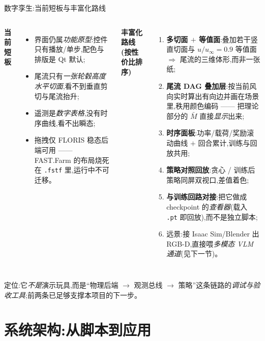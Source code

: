 \documentclass[aspectratio=169,11pt,UTF8]{ctexbeamer}
\newcommand{\wind}{u_{\infty}}
\newcommand{\emphb}[1]{\textcolor{myred}{\textbf{#1}}}
\newcommand{\emphg}[1]{\textcolor{mygreen}{\textbf{#1}}}
\begin{document}
\begin{frame}{数字孪生:当前短板与丰富化路线}
\small
\begin{columns}[T]
\textbf{当前短板}
\begin{itemize}\setlength\itemsep{1pt}
  \item 界面仍属\emph{功能原型}:控件只有播放/单步,配色与排版是 Qt 默认;
  \item 尾流只有\emph{一张轮毂高度水平切面},看不到垂直剪切与尾流抬升;
  \item 遥测是\emph{数字表格},没有时序曲线,看不出瞬态;
  \item 拖拽仅 FLORIS 稳态后端可用 —— FAST.Farm 的布局烧死在 \texttt{.fstf} 里,运行中不可迁移。
\end{itemize}
\textbf{丰富化路线(按性价比排序)}
\begin{enumerate}\setlength\itemsep{1pt}
  \item \emphg{多切面 $+$ 等值面}:叠加若干竖直切面与 $u/\wind=0.9$ 等值面 $\Rightarrow$ 尾流的三维体形,而非一张纸;
  \item \emphg{尾流 DAG 叠加层}:按当前风向实时算出有向边并画在场景里,秩用颜色编码 —— 把理论部分的 $\bar M$ 直接\emph{显示}出来;
  \item \emphg{时序面板}:功率/载荷/奖励滚动曲线 $+$ 回合累计,训练与回放共用;
  \item \emphg{策略对照回放}:贪心 / 训练后策略同屏双视口,差值着色;
  \item \emphb{与训练回路对接}:把它做成 checkpoint 的\emph{查看器}(载入 \texttt{.pt} 即回放),而不是独立脚本;
  \item 远景:接 Isaac Sim/Blender 出 RGB-D,直接喂\emph{多模态 VLM 通道}(见下一节)。
\end{enumerate}
\end{columns}
\vspace{0.5mm}
\centering\footnotesize\color{mygray}
定位:它\emph{不是}演示玩具,而是“物理后端 $\to$ 观测总线 $\to$ 策略”这条链路的\emph{调试与验收工具};前两条已足够支撑本项目的下一步。
\end{frame}

\section{系统架构:从脚本到应用}
\end{document}

